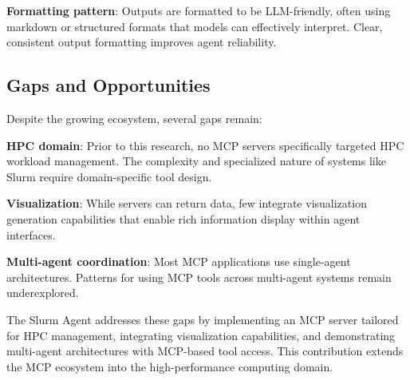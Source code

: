 \textbf{Formatting pattern}: Outputs are formatted to be LLM-friendly, often using markdown or structured formats that models can effectively interpret. Clear, consistent output formatting improves agent reliability.

\subsection{Gaps and Opportunities}

Despite the growing ecosystem, several gaps remain:

\textbf{HPC domain}: Prior to this research, no MCP servers specifically targeted HPC workload management. The complexity and specialized nature of systems like Slurm require domain-specific tool design.

\textbf{Visualization}: While servers can return data, few integrate visualization generation capabilities that enable rich information display within agent interfaces.

\textbf{Multi-agent coordination}: Most MCP applications use single-agent architectures. Patterns for using MCP tools across multi-agent systems remain underexplored.

The Slurm Agent addresses these gaps by implementing an MCP server tailored for HPC management, integrating visualization capabilities, and demonstrating multi-agent architectures with MCP-based tool access. This contribution extends the MCP ecosystem into the high-performance computing domain.
